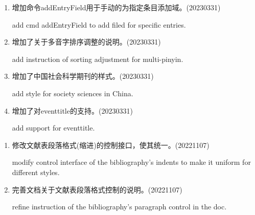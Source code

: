 \label{up:20230331}
\begin{enumerate}

\item 增加命令addEntryField用于手动的为指定条目添加域。(20230331)

add cmd addEntryField to add filed for specific entries.


\item 增加了关于多音字排序调整的说明。(20230331)

add instruction of sorting adjustment for multi-pinyin.


\item 增加了中国社会科学期刊的样式。(20230331)

add style for society sciences in China.

\item 增加了对eventtitle的支持。(20230331)

add support for eventtitle.

\end{enumerate}


\label{up:20221107}
\begin{enumerate}


\item 修改文献表段落格式(缩进)的控制接口，使其统一。(20221107)

modify control interface of the bibliography's indents to make it uniform for different styles.

\item 完善文档关于文献表段落格式控制的说明。(20221107)

refine instruction of the bibliography's paragraph control in the doc.

\end{enumerate}


